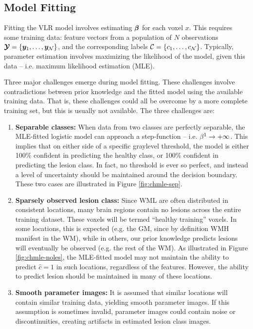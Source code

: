 \subsection{Model Fitting}\label{ss:modelfitting}
Fitting the VLR model involves estimating $\bm{\beta}$ for each voxel $x$. This requires some training data: feature vectors from a population of $N$ observations $\bm{\mathcal{Y}} = \{\bm{y}_1,\dots,\bm{y}_{\mathcal{N}}\}$, and the corresponding labels $\mathcal{C} = \{c_1,\dots,c_{\mathcal{N}}\}$. Typically, parameter estimation involves maximizing the likelihood of the model, given this data -- i.e. maximum likelihood estimation (MLE).
\par
Three major challenges emerge during model fitting. These challenges involve contradictions between prior knowledge and the fitted model using the available training data. That is, these challenges could all be overcome by a more complete training set, but this is usually not available. The three challenges are:
\begin{enumerate}
  \item \label{chmle:separable} \textbf{Separable classes:} 
  When data from two classes are perfectly separable, the MLE-fitted logistic model can approach a step-function -- i.e. $\beta^1\rightarrow+\infty$. This implies that on either side of a specific graylevel threshold, the model is either 100\% confident in predicting the healthy class, or 100\% confident in predicting the lesion class. In fact, no threshold is ever so perfect, and instead a level of uncertainty should be maintained around the decision boundary. These two cases are illustrated in Figure \ref{fig:chmle-sep}.
  \item \label{chmle:sparse} \textbf{Sparsely observed lesion class:} 
  Since WML are often distributed in consistent locations, many brain regions contain no lesions across the entire training dataset. These voxels will be termed ``healthy training'' voxels. In some locations, this is expected (e.g. the GM, since by definition WMH manifest in the WM), while in others, our prior knowledge predicts lesions will eventually be observed (e.g. the rest of the WM). As illustrated in Figure \ref{fig:chmle-noles}, the MLE-fitted model may not maintain the ability to predict $\hat{c} = 1$ in such locations, regardless of the features. However, the ability to predict lesion should be maintained in many of these locations.
  \item \label{chmle:noisy} \textbf{Smooth parameter images:} 
  It is assumed that similar locations will contain similar training data, yielding smooth parameter images. If this assumption is sometimes invalid, parameter images could contain noise or discontinuities, creating artifacts in estimated lesion class images.
\end{enumerate}
